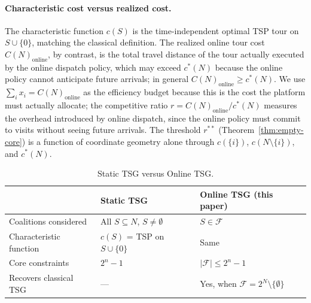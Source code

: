\documentclass[11pt]{article}
\theoremstyle{plain}
\theoremstyle{definition}
\theoremstyle{remark}
\newcommand{\F}{\mathcal{F}}
\newcommand{\cstar}{c^{\ast}}
\begin{document}
\paragraph{Characteristic cost versus realized cost.} The characteristic function $c(S)$ is the time-independent optimal TSP tour on $S\cup\{0\}$, matching the classical \citet{potters1992tsg} definition. The realized online tour cost $C(N)_{\text{online}}$, by contrast, is the total travel distance of the tour actually executed by the online dispatch policy, which may exceed $\cstar(N)$ because the online policy cannot anticipate future arrivals; in general $C(N)_{\text{online}} \ge \cstar(N)$. We use $\sum_i x_i = C(N)_{\text{online}}$ as the efficiency budget because this is the cost the platform must actually allocate; the competitive ratio $r = C(N)_{\text{online}}/\cstar(N)$ measures the overhead introduced by online dispatch, since the online policy must commit to visits without seeing future arrivals. The threshold $r^{\ast\ast}$ (Theorem~\ref{thm:empty-core}) is a function of coordinate geometry alone through $c(\{i\})$, $c(N\setminus\{i\})$, and $\cstar(N)$.

\begin{table}[t]
\centering
\caption{Static TSG versus Online TSG.}
\label{tab:static-vs-temporal}
\small
\begin{tabular}{@{}lll@{}}
\toprule
 & Static TSG \citep{potters1992tsg} & Online TSG (this paper) \\
\midrule
Coalitions considered & All $S\subseteq N$, $S\neq\emptyset$ & $S\in\F$ \\
Characteristic function & $c(S)$ = TSP on $S\cup\{0\}$ & Same \\
Core constraints & $2^n-1$ & $|\F|\le 2^n-1$ \\
Recovers classical TSG & --- & Yes, when $\F=2^N\setminus\{\emptyset\}$ \\
\bottomrule
\end{tabular}
\end{table}
\end{document}
